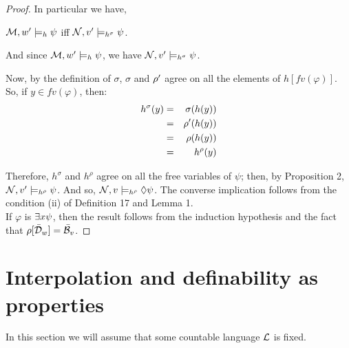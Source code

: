 \begin{proof}
In particular we have,

\begin{center}
$\mathcal{M},w^{\prime} \models_{h} \psi$ iff $\mathcal{N},v^{\prime} \models_{{h}^{\sigma}} \psi$.
\end{center}

And since $\mathcal{M},w^{\prime} \models_{h} \psi$, we have $\mathcal{N},v^{\prime} \models_{{h}^{\sigma}} \psi$. 

\qquad Now, by the definition of $\sigma$, $\sigma$ and $\rho^{\prime}$ agree on all the elements of $h[fv(\varphi)]$.\\
So, if $y \in fv(\varphi)$, then:
\begin{eqnarray*}
h^{\sigma}(y) & = & \sigma (h(y))\\
& = & \rho^{\prime} (h(y))\\
& = & \rho (h(y))\\
& = & h^{\rho}(y)\\
\end{eqnarray*}

\qquad Therefore, $h^{\sigma}$ and $h^{\rho}$ agree on all the free variables of $\psi$; then, by Proposition 2, $\mathcal{N},v^{\prime} \models_{{h}^{\rho}} \psi$. And so, $\mathcal{N},v \models_{{h}^{\rho}} \Diamond \psi$. The converse implication follows from the condition (ii) of Definition 17 and Lemma 1.\\

\qquad If $\varphi$ is $\exists x \psi$, then the result follows from the induction hypothesis and the fact that $\rho[\bar{\mathcal{D}}_{w}] = \bar{\mathcal{B}}_{v}$.
\end{proof}


\section{Interpolation and definability as properties}

\qquad In this section we will assume that some countable language $\mathcal{L}$ is fixed.

